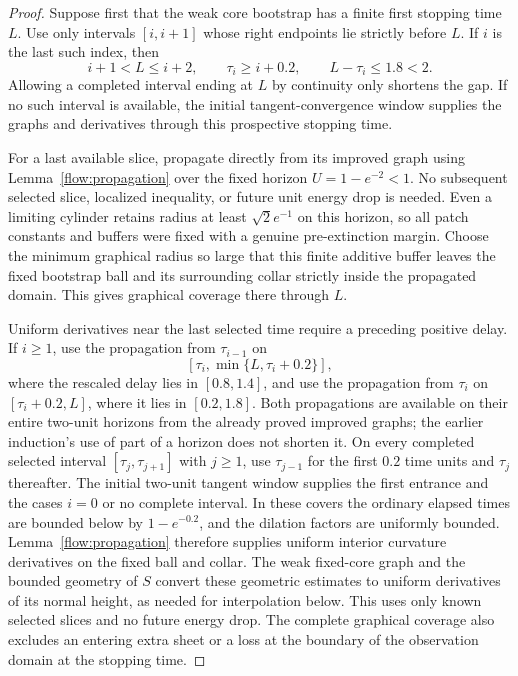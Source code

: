 \begin{proof}
Suppose first that the weak core bootstrap has a finite first
stopping time $L$.  Use only intervals $[i,i+1]$ whose right
endpoints lie strictly before $L$.  If $i$ is the last such
index, then
\begin{equation}\label{flow:last-gap}
 i+1<L\le i+2,
 \qquad \tau_i\ge i+0.2,
 \qquad L-\tau_i\le1.8<2.
\end{equation}
Allowing a completed interval ending at $L$ by continuity only
shortens the gap.  If no such interval is available, the
initial tangent-convergence window supplies the graphs and
derivatives through this prospective stopping time.

For a last available slice, propagate directly from its improved
graph using Lemma~\ref{flow:propagation} over the fixed horizon
$U=1-e^{-2}<1$.  No subsequent selected slice, localized
inequality, or future unit energy drop is needed.  Even a
limiting cylinder retains radius at least $\sqrt2 e^{-1}$ on
this horizon, so all patch constants and buffers were fixed
with a genuine pre-extinction margin.  Choose the minimum
graphical radius so large that this finite additive buffer
leaves the fixed bootstrap ball and its surrounding collar
strictly inside the propagated domain.  This gives graphical
coverage there through $L$.

Uniform derivatives near the last selected time require a preceding
positive delay.  If $i\ge1$, use the propagation from $\tau_{i-1}$ on
\[
 [\tau_i,\min\{L,\tau_i+0.2\}],
\]
where the rescaled delay lies in $[0.8,1.4]$, and use the propagation
from $\tau_i$ on $[\tau_i+0.2,L]$, where it lies in $[0.2,1.8]$.
Both propagations are available on their entire two-unit horizons
from the already proved improved graphs; the earlier induction's use
of part of a horizon does not shorten it.  On every completed selected
interval $[\tau_j,\tau_{j+1}]$ with $j\ge1$, use $\tau_{j-1}$ for
the first $0.2$ time units and $\tau_j$ thereafter.  The initial
two-unit tangent window supplies the first entrance and the cases
$i=0$ or no complete interval.  In these covers the ordinary elapsed
times are bounded below by $1-e^{-0.2}$, and the dilation factors are
uniformly bounded.  Lemma~\ref{flow:propagation} therefore supplies
uniform interior curvature derivatives on the fixed ball and collar.
The weak fixed-core graph and the bounded geometry of $S$ convert
these geometric estimates to uniform derivatives of its normal
height, as needed for interpolation below.  This uses only known
selected slices and no future energy drop.  The complete graphical
coverage also excludes an entering extra sheet or a loss at the
boundary of the observation domain at the stopping time.


\end{proof}
